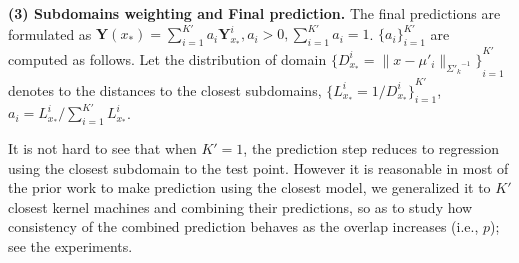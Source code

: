 \begin{comment}
\textbf{IWTGP:}
\begin{equation}
\begin{split}
\hat{Y^i_{x_*}} =  \underset{Y^i_{x_*}}{\operatorname{argmin       }}[ & k_Y(\textbf{Y}^i_{x_*},\textbf{Y}^i_{x_*}) -2 
k_y(\textbf{Y}^i_{x_*})^T \textbf{u}_w -\\ & \eta_w  log (K_Y(\textbf{Y}^i_{x_*},\textbf{Y}^i_{x_*}) -\\& 
k_y(\textbf{Y}^i_{x_*})^T {\textbf{W}^i}^\frac{1}{2} ({\textbf{W}^i}^\frac{1}{2} \textbf{K}_Y {\textbf{W}^i}^\frac{1}{2} +  \lambda_y I)^{-1} \\&{\textbf{W}^i}^\frac{1}{2} k_y(\textbf{Y}^i_{x_*}) ) ]
\end{split}
\end{equation}
where $\textbf{u}_w = \textbf{W}^\frac{1}{2}  (\textbf{W}^\frac{1}{2} \textbf{K}_X \textbf{W}^\frac{1}{2} + \lambda_x I)^{-1} \textbf{W}^\frac{1}{2} k_x(\textbf{x})$, $\eta_w = k_X(\textbf{x},\textbf{x}) - k_x(\textbf{x})^T \textbf{u}_w$. As detailed in section ~\ref{sec:train2}, $({\textbf{W}^i}^\frac{1}{2} \textbf{K}_X^i {\textbf{W}^i}^\frac{1}{2} + \lambda_x \textbf{I})^{-1}$,  $({{\textbf{W}^i}}^\frac{1}{2} \textbf{K}_X {\textbf{W}^i}^\frac{1}{2} + \lambda_x \textbf{I})^{-1}$ could be computed in quadratic time given  $\mathcal{M}^i$ and $W$. Hence,  the $\hat{Y^i_{x_*}}_j$ has  $O(l_d \cdot M)^2$ complexity, where $l_2$ is the number of iterations. 
\end{comment}

\noindent \textbf{{(3) Subdomains weighting and Final prediction.}}
The final predictions are formulated as $\textbf{Y}(x_*) = \sum_{i=1}^{K'} a_i \textbf{Y}^i_{x_*}, a_i>0, \sum_{i=1}^{K'} {a_i} =1 $. ${\{a_i\}}_{i=1}^{K'}$ are computed as follows.  Let the distribution of domain ${\{D^i_{x_*} = \|x-\mu'_{i} \|_{{\Sigma'_{k}}^{-1}}\}}_{i=1}^{K'}$ denotes to the distances to the closest subdomains, ${\{L^i_{x_*} = {1}/{D^i_{x_*}}\}}_{i=1}^{K'}$, $a_i ={L^i_{x_*}}/{\sum_{i=1}^{K'} {L^i_{x_*}}} $. 


It is not hard to see that when $K' = 1$, the prediction step reduces to regression using the closest subdomain to the test point. However it is  reasonable in most of the prior work to make prediction using the closest model, we generalized it to $K'$ closest kernel machines and combining their predictions,  so as to study how consistency of the combined prediction behaves as the overlap increases (i.e., $p$); see the experiments.


